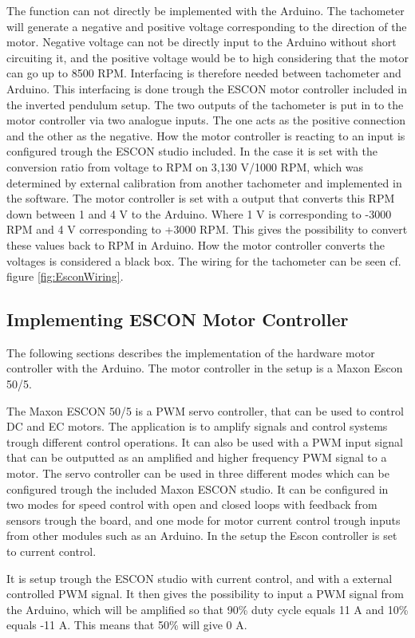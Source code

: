 The function can not directly be implemented with the Arduino. The tachometer will generate a negative and positive voltage corresponding to the direction of the motor. Negative voltage can not be directly input to the Arduino without short circuiting it, and the positive voltage would be to high considering that the motor can go up to 8500 RPM. Interfacing is therefore needed between tachometer and Arduino.
This interfacing is done trough the ESCON motor controller included in the inverted pendulum setup. The two outputs of the tachometer is put in to the motor controller via two analogue inputs. The one acts as the positive connection and the other as the negative. How the motor controller is reacting to an input is configured trough the ESCON studio included. In the case it is set with the conversion ratio from voltage to RPM on 3,130 V/1000 RPM, which was determined by external calibration from another tachometer and implemented in the software.  The motor controller is set with a output that converts this RPM down between 1 and 4 V to the Arduino. Where 1 V is corresponding to -3000 RPM and 4 V corresponding to +3000 RPM. This gives the possibility to convert these values back to RPM in Arduino. How the motor controller converts the voltages is considered a black box. The wiring for the tachometer can be seen cf. figure \ref{fig:EsconWiring}. 


\subsection{Implementing ESCON Motor Controller}
The following sections describes the implementation of the hardware motor controller with the Arduino. The motor controller in the setup is a Maxon Escon 50/5.

The Maxon ESCON 50/5 is a PWM servo controller, that can be used to control DC and EC motors. The application is to amplify signals and control systems trough different control operations. It can also be used with a PWM input signal that can be outputted as an amplified and higher frequency PWM signal to a motor. The servo controller can be used in three different modes which can be configured trough the included Maxon ESCON studio. It can be configured in two modes for speed control with open and closed loops with feedback from sensors trough the board, and one mode for motor current control trough inputs from other modules such as an Arduino. In the setup the Escon controller is set to current control.


It is setup trough the ESCON studio with current control, and with a external controlled PWM signal. It then gives the possibility to input a PWM signal from the Arduino, which will be amplified so that 90\% duty cycle equals 11 A and 10\% equals -11 A. This means that 50\% will give 0 A.


